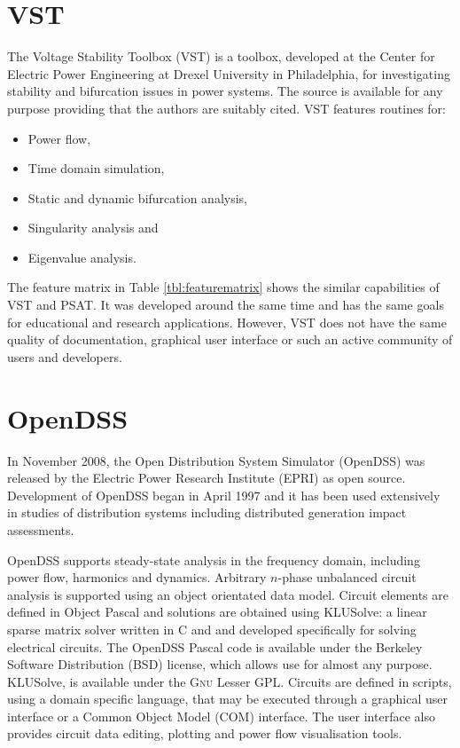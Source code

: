 \section{VST}
The Voltage Stability Toolbox (VST) is a \matlab toolbox, developed at the
Center for Electric Power Engineering at Drexel University in Philadelphia, for
investigating stability and bifurcation issues in power systems.  The source
is available for any purpose providing that the authors are suitably cited.
VST features routines for:
\begin{itemize}
  \item Power flow,
  \item Time domain simulation,
  \item Static and dynamic bifurcation analysis,
  \item Singularity analysis and
  \item Eigenvalue analysis.
\end{itemize}
The feature matrix in Table \ref{tbl:featurematrix} shows the similar
capabilities of VST and PSAT. It was developed around the same time and has
the same goals for educational and research applications.  However, VST does
not have the same quality of documentation, graphical user interface or such an
active community of users and developers.

\section{OpenDSS}
In November 2008, the Open Distribution System Simulator (OpenDSS) was released
by the Electric Power Research Institute (EPRI) as open source.  Development of
OpenDSS began in April 1997 and it has been used extensively in studies of
distribution systems including distributed generation impact assessments.

OpenDSS supports steady-state analysis in the frequency domain, including power
flow, harmonics and dynamics.  Arbitrary $n$-phase unbalanced circuit analysis
is supported using an object orientated data model.  Circuit elements are
defined in Object Pascal and solutions are obtained using KLUSolve: a linear
sparse matrix solver written in C and \CC and developed specifically for solving
electrical circuits. The OpenDSS Pascal code is available under the Berkeley
Software Distribution (BSD) license, which allows use for almost any purpose.
KLUSolve, is available under the \textsc{Gnu} Lesser GPL. Circuits are defined
in scripts, using a domain specific language, that may be executed through a
graphical user interface or a Common Object Model (COM) interface. The user
interface also provides circuit data editing, plotting and power flow
visualisation tools.

